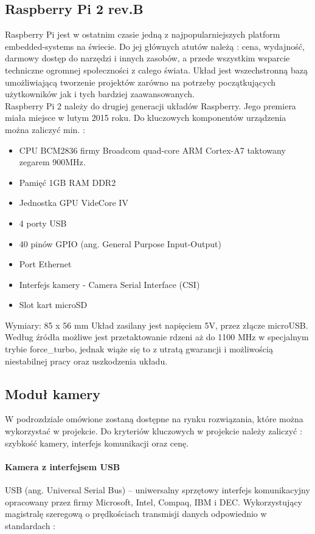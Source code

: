 \subsection{Raspberry Pi 2 rev.B}
Raspberry Pi jest w ostatnim czasie jedną z najpopularniejszych platform embedded-systems na świecie. Do jej głównych atutów należą : cena, wydajność, darmowy dostęp do narzędzi i innych zasobów, a przede wszystkim wsparcie techniczne ogromnej społeczności z całego świata. Układ jest wszechstronną bazą umożliwiającą tworzenie projektów zarówno na potrzeby początkujących użytkowników jak i tych bardziej zaawansowanych.\\
Raspberry Pi 2 należy do drugiej generacji układów Raspberry. Jego premiera miała miejsce w lutym 2015 roku. Do kluczowych komponentów urządzenia można zaliczyć min. :
\begin{itemize}[noitemsep]
\item CPU BCM2836 firmy Broadcom quad-core ARM Cortex-A7 taktowany zegarem 900MHz.
\item Pamięć 1GB RAM DDR2
\item Jednostka GPU VideCore IV
\item 4 porty USB
\item 40 pinów GPIO (ang. General Purpose Input-Output)
\item Port Ethernet
\item Interfejs kamery - Camera Serial Interface (CSI)
\item Slot kart microSD
\end{itemize}
Wymiary: 85 x 56 mm
Układ zasilany jest napięciem 5V, przez złącze microUSB.
Według źródła \cite{haydenjames} możliwe jest przetaktowanie rdzeni aż do 1100 MHz w specjalnym trybie force\_turbo, jednak wiąże się to z utratą gwarancji i możliwością niestabilnej pracy oraz uszkodzenia układu.
\subsection{Moduł kamery}
W podrozdziale omówione zostaną dostępne na rynku rozwiązania, które można wykorzystać w projekcie.  Do kryteriów kluczowych w projekcie należy zaliczyć : szybkość kamery, interfejs komunikacji oraz cenę. 

\paragraph{Kamera  z interfejsem USB}

USB (ang. Universal Serial Bus) – uniwersalny sprzętowy interfejs komunikacyjny opracowany przez firmy Microsoft, Intel, Compaq, IBM i DEC. Wykorzystujący magistralę szeregową o prędkościach transmisji danych odpowiednio w standardach :

